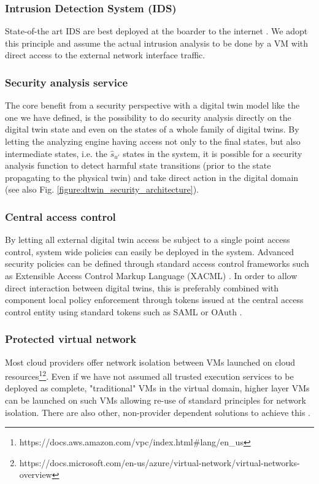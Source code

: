 \subsubsection{Intrusion Detection System (IDS)}
State-of-the art IDS are best deployed at the boarder to the internet \cite{Kruegel2002}. We adopt this principle and assume the actual intrusion analysis to be done by a VM with direct access to the external network interface traffic. 
\subsubsection{Security analysis service} \label{dtwinsecurity:security_analysis}
The core benefit from a security perspective with a digital twin model like the one we have defined, is the possibility to do security analysis directly on the digital twin state and even on the states of a whole family of digital twins. By letting the analyzing engine having access not only to the final states, but also intermediate states, i.e. the $\hat{s}_{u'}$ states in the system, it is possible for a security analysis function to detect harmful state transitions (prior to the state propagating to the physical twin) and take direct action in the digital domain (see also Fig. \ref{figure:dtwin_security_architecture}).
\subsubsection{Central access control}
By letting all external digital twin access be subject to a single point access control, system wide policies can easily be deployed in the system.  Advanced security policies can be defined through standard access control frameworks such as Extensible Access Control Markup Language (XACML) \cite{Rissanen2013}. In order to allow direct interaction between digital twins, this is preferably combined with component local policy enforcement through tokens issued at the central access control entity using standard tokens such as SAML \cite{Campbell2015} or OAuth \cite{Hardt2012}. 
\subsubsection{Protected virtual network}
\label{dtwinsecurity_secarch_VPN}
Most cloud providers offer network isolation between VMs launched on cloud resources\footnote{https://docs.aws.amazon.com/vpc/index.html\#lang/en\_us}\footnote{https://docs.microsoft.com/en-us/azure/virtual-network/virtual-networks-overview}. Even if we have not assumed all trusted execution services to be deployed as complete, "traditional" VMs in the virtual domain, higher layer VMs can be launched on such VMs allowing re-use of standard principles for network isolation. There are also other, non-provider dependent solutions to achieve this \cite{Li2010}.

